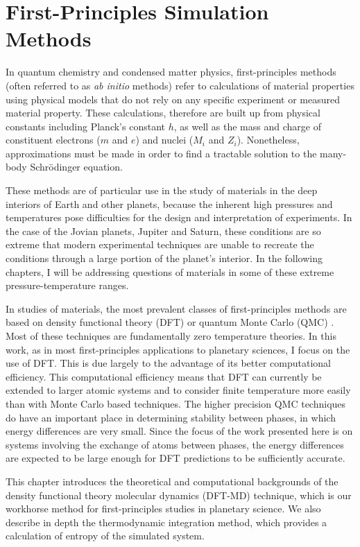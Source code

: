 \chapter{First-Principles Simulation Methods}\label{chap2}


In quantum chemistry and condensed matter physics, first-principles methods (often
referred to as \textit{ab initio} methods) refer to calculations of material properties
using physical models that do not rely on any specific experiment or measured
material property. These calculations, therefore are built up from physical constants
including Planck's constant $h$, as well as the mass  and charge of constituent
electrons ($m$ and $e$) and nuclei ($M_i$ and $Z_i$). Nonetheless, approximations
must be made in order to find a tractable solution to the many-body Schr\"odinger equation.

These methods are of particular use in the study of materials in the deep interiors
of Earth and other planets, because the inherent high pressures and temperatures
pose difficulties for the design and interpretation of experiments. In the case of the
Jovian planets, Jupiter and Saturn, these conditions are so extreme that modern
experimental techniques are unable to recreate the conditions through a large portion
of the planet's interior. In the following chapters, I will be addressing questions of
materials in some of these extreme pressure-temperature ranges.

In studies of materials, the most prevalent classes of first-principles methods are based
on density functional theory (DFT) or quantum Monte Carlo (QMC)
\citep{Allen1987,Newman1999,martin-esbook}. Most of these
techniques are fundamentally zero temperature theories. In this work, as in most
first-principles applications to planetary sciences, I focus on the use of DFT. This
is due largely to the advantage of its better computational efficiency. This
computational efficiency means that DFT can currently be extended to larger atomic
systems and to consider finite temperature more easily than with Monte Carlo based
techniques. The higher precision QMC techniques do have an important place in
determining stability between phases, in which energy differences are very small.
Since the focus of the work presented here is on systems involving the exchange of
atoms between phases, the energy differences are expected to be large enough for DFT
predictions to be sufficiently accurate.

This chapter introduces the theoretical and computational backgrounds of the density
functional theory molecular dynamics (DFT-MD) technique, which is our workhorse
method for first-principles studies in planetary science. We also describe in depth
the thermodynamic integration method, which provides a calculation of entropy of the
simulated system.


